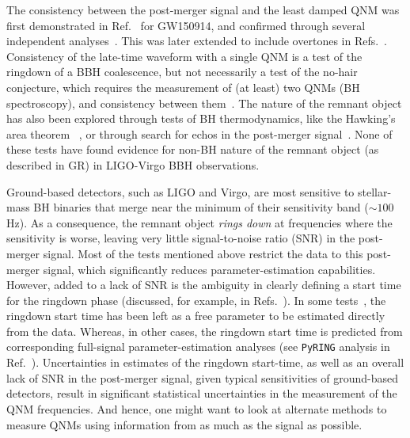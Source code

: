 The consistency between the post-merger signal and the least damped QNM was first demonstrated in
Ref.~\cite{TheLIGOScientific:2016src} for GW150914, and confirmed through several independent analyses~\cite{Brito:2018rfr,Carullo:2019flw,Isi:2019aib,CalderonBustillo:2020tjf}. This was later extended to include
overtones in Refs.~\cite{Giesler:2019uxc,Isi:2019aib,Bhagwat:2019dtm,Forteza:2020hbw,Abbott:2020jks}. Consistency of the late-time waveform with a single QNM is a test of the ringdown of
a BBH coalescence, but not necessarily a test of the no-hair
conjecture, which requires the measurement of (at least) two QNMs (BH
spectroscopy), and consistency between them~\cite{Dreyer:2003bv,Carullo:2018sfu,Carullo:2018gah,Isi:2019aib,Bhagwat:2019bwv,Cabero:2019zyt,Maselli:2019mjd}. The nature of the remnant object has also been explored through tests of BH thermodynamics, like the Hawking's area
theorem~\cite{Cabero:2017avf,Isi:2020tac} , or through search for echos in the
post-merger signal~\cite{Nielsen:2018lkf,Tsang:2019zra,Lo:2018sep,Abedi:2018npz,Abedi:2020sgg,Testa:2018bzd}.  None of these tests have found evidence for non-BH nature of the remnant
object (as described in GR) in LIGO-Virgo BBH observations.

Ground-based detectors, such as LIGO and Virgo, are most sensitive to
stellar-mass BH binaries that merge near the
minimum of their sensitivity band ($\sim 100$ Hz). As a consequence, the
remnant object \textit{rings down} at frequencies where the sensitivity is worse, leaving
very little signal-to-noise ratio (SNR) in the
post-merger signal. Most of the tests mentioned above restrict the data to this post-merger signal, which significantly reduces parameter-estimation capabilities. However, added to a lack of SNR is the ambiguity in clearly defining a start time for the ringdown phase (discussed, for example, in Refs.~\cite{Berti:2007fi,Baibhav:2017jhs,Bhagwat:2017tkm}). In some tests~\cite{Carullo:2018gah,Carullo:2019flw}, the ringdown start time has been left as a
free parameter to be estimated directly from the data. Whereas, in other cases, the ringdown start time is predicted from corresponding full-signal parameter-estimation analyses (see \texttt{PyRING} analysis in Ref.~\cite{Abbott:2020jks}). Uncertainties
in estimates of the ringdown start-time, as well as an overall lack of
SNR in the post-merger signal, given typical sensitivities of
ground-based detectors, result in significant statistical uncertainties
in the measurement of the QNM frequencies. And hence, one might want to look at alternate methods to measure QNMs using information from as much as the signal as possible.

